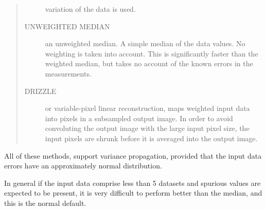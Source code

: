 \documentclass[twoside,11pt]{article}
\newcommand{\latexhtml}[2]{#1}
\renewcommand{\_}{\texttt{\symbol{95}}}
\newcommand{\ttsize}{\latexhtml{\small}{}}
\newenvironment{myquote}{\begin{quote}\ttsize}{\end{quote}}
\begin{document}
\begin{myquote}
\begin{description}
variation of the data is used.
\item[UNWEIGHTED MEDIAN] an unweighted median. A simple median of the 
data values. No weighting is taken into account. This is significantly 
faster than the weighted median, but takes no account of the known
errors in the measurements.
\item[DRIZZLE]  or variable-pixel linear reconstruction, maps weighted
input data into pixels in a subsampled output image. In order to avoid
convoluting the output image with the large input pixel size, the input
pixels are shrunk before it is averaged into the output image.
\end{description}
\end{myquote}

All of these methods, support variance propagation, 
provided that the input data errors have an approximately normal distribution.

In general if the input data comprise less than 5 datasets and spurious
values are expected to be present, it is very difficult to perform
better than the median, and this is the normal default.
\end{document}
